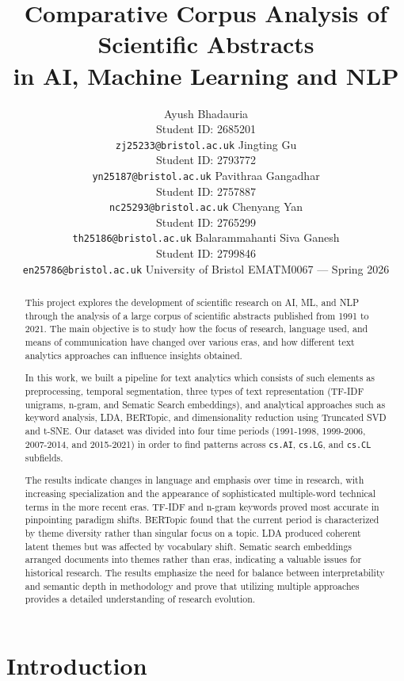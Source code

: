 \documentclass{article}
\title{Comparative Corpus Analysis of Scientific Abstracts\\
       in AI, Machine Learning and NLP}
\author{
  Ayush Bhadauria \\
  Student ID: 2685201 \\
  \texttt{zj25233@bristol.ac.uk}
  \And
  Jingting Gu \\
  Student ID: 2793772 \\
  \texttt{yn25187@bristol.ac.uk}
  \And
  Pavithraa Gangadhar \\
  Student ID: 2757887 \\
  \texttt{nc25293@bristol.ac.uk}
  \AND
  Chenyang Yan \\
  Student ID: 2765299 \\
  \texttt{th25186@bristol.ac.uk}
  \And
  Balarammahanti Siva Ganesh \\
  Student ID: 2799846 \\
  \texttt{en25786@bristol.ac.uk}
  \AND
  University of Bristol \quad EMATM0067 --- Spring 2026
}
\begin{document}
\maketitle

\begin{abstract}
This project explores the development of scientific
research on AI, ML, and NLP through the analysis of
a large corpus of scientific abstracts published from
1991 to 2021. The main objective is to study how the
focus of research, language used, and means of communication
have changed over various eras, and how different text
analytics approaches can influence insights obtained.

In this work, we built a pipeline for text analytics
which consists of such elements as preprocessing, temporal
segmentation, three types of text representation (TF-IDF
unigrams, n-gram, and Sematic Search embeddings), and analytical
approaches such as keyword analysis, LDA, BERTopic, and
dimensionality reduction using Truncated SVD and t-SNE.
Our dataset was divided into four time periods (1991-1998,
1999-2006, 2007-2014, and 2015-2021) in order to find
patterns across \texttt{cs.AI}, \texttt{cs.LG},
and \texttt{cs.CL} subfields.

The results indicate changes in language and emphasis
over time in research, with increasing specialization and
the appearance of sophisticated multiple-word technical
terms in the more recent eras. TF-IDF and n-gram keywords
proved most accurate in pinpointing paradigm shifts. BERTopic
found that the current period is characterized by
theme diversity rather than singular focus on a topic.
LDA produced coherent latent themes but was affected by
vocabulary shift. Sematic search embeddings arranged documents into
themes rather than eras, indicating a valuable issues for historical research. The results emphasize the
need for balance between interpretability and semantic
depth in methodology and prove that utilizing multiple
approaches provides a detailed understanding of research evolution.
\end{abstract}


\section{Introduction}
\end{document}
